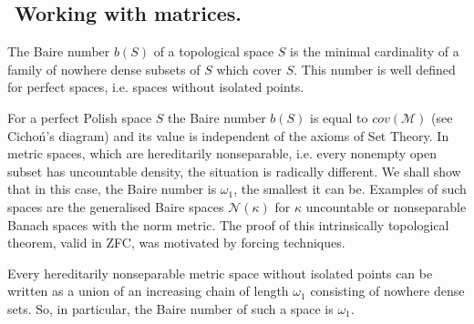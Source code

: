 \subsection{${}$ \hspace{-1em}Working with matrices.}

The Baire number $b(S)$ of a topological space $S$ is the minimal cardinality of a family of nowhere dense subsets of $S$ which cover $S$.
This number is well defined for perfect spaces, i.e. spaces without isolated points.

For a perfect Polish space $S$ the Baire number $b(S)$ is equal to $cov({\mathcal M})$ (see Cicho\'n's diagram)%
and its value is independent of the axioms of Set Theory. In metric spaces, which are hereditarily nonseparable, i.e. every nonempty open subset
has uncountable density, the situation is radically different. We shall show that in this case, the Baire number is $\omega_1$, the smallest
it can be. Examples of such spaces are the generalised Baire spaces ${\mathcal N}(\kappa)$ for $\kappa$ uncountable or nonseparable Banach spaces with
the norm metric. The proof of this intrinsically topological theorem, valid in ZFC, was motivated by forcing techniques.

 \begin{theorem}\label{vopenka}
Every hereditarily nonseparable metric space without isolated points can be written as
 a union of an increasing chain of length $\omega_1$ consisting of nowhere dense sets. So, in particular, the Baire number of such a
 space is $\omega_1$.
 \end{theorem}


